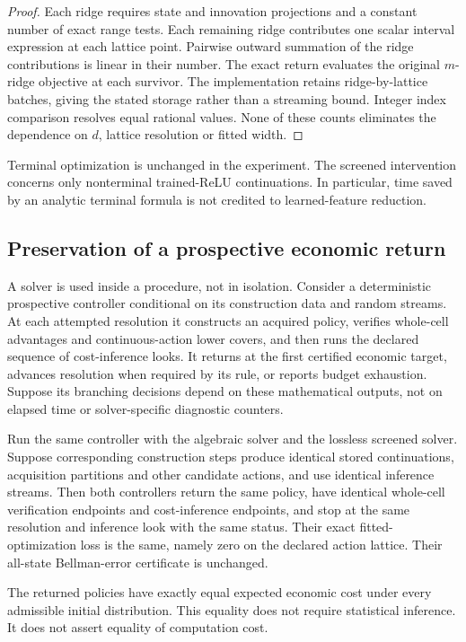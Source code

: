 \begin{proof}
Each ridge requires state and innovation projections and a constant number of exact range tests. Each remaining ridge contributes one scalar interval expression at each lattice point. Pairwise outward summation of the ridge contributions is linear in their number. The exact return evaluates the original $m$-ridge objective at each survivor. The implementation retains ridge-by-lattice batches, giving the stated storage rather than a streaming bound. Integer index comparison resolves equal rational values. None of these counts eliminates the dependence on $d$, lattice resolution or fitted width.
\end{proof}

Terminal optimization is unchanged in the experiment. The screened intervention concerns only nonterminal trained-ReLU continuations. In particular, time saved by an analytic terminal formula is not credited to learned-feature reduction.

\subsection{Preservation of a prospective economic return}
A solver is used inside a procedure, not in isolation. Consider a deterministic prospective controller conditional on its construction data and random streams. At each attempted resolution it constructs an acquired policy, verifies whole-cell advantages and continuous-action lower covers, and then runs the declared sequence of cost-inference looks. It returns at the first certified economic target, advances resolution when required by its rule, or reports budget exhaustion. Suppose its branching decisions depend on these mathematical outputs, not on elapsed time or solver-specific diagnostic counters.

\begin{theorem}\label{thm:transcript59}
Run the same controller with the algebraic solver and the lossless screened solver. Suppose corresponding construction steps produce identical stored continuations, acquisition partitions and other candidate actions, and use identical inference streams. Then both controllers return the same policy, have identical whole-cell verification endpoints and cost-inference endpoints, and stop at the same resolution and inference look with the same status. Their exact fitted-optimization loss is the same, namely zero on the declared action lattice. Their all-state Bellman-error certificate is unchanged.

The returned policies have exactly equal expected economic cost under every admissible initial distribution. This equality does not require statistical inference. It does not assert equality of computation cost.
\end{theorem}

